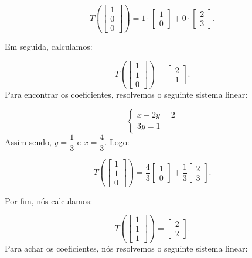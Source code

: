 \begin{Example}
	$$
	T\left(\begin{bmatrix}
		1 \\
		0 \\
		0
	\end{bmatrix}\right) = 1\cdot\begin{bmatrix}
		1 \\
		0
	\end{bmatrix} + 0\cdot\begin{bmatrix}
		2 \\
		3
	\end{bmatrix}.
	$$
	
	Em seguida, calculamos:
	
	$$
	T\left(\begin{bmatrix}
		1 \\
		1 \\
		0
	\end{bmatrix}\right) = \begin{bmatrix}
		2 \\
		1
	\end{bmatrix}.
	$$
	Para encontrar os coeficientes, resolvemos o seguinte sistema linear:
	
	$$
	\begin{cases}
		x + 2y = 2 \\
		3y = 1
	\end{cases}
	$$
	Assim sendo, $y = \dfrac{1}{3}$ e $x = \dfrac{4}{3}$. Logo:
	
	$$
	T\left(\begin{bmatrix}
		1 \\
		1 \\
		0
	\end{bmatrix}\right) = \dfrac{4}{3}\begin{bmatrix}
		1 \\
		0
	\end{bmatrix} + \dfrac{1}{3}\begin{bmatrix}
		2 \\
		3
	\end{bmatrix}.
	$$
	
	Por fim, nós calculamos:
	
	$$
	T\left(\begin{bmatrix}
		1 \\
		1 \\
		1
	\end{bmatrix}\right) = \begin{bmatrix}
		2 \\
		2
	\end{bmatrix}.
	$$
	Para achar os coeficientes, nós resolvemos o seguinte sistema linear:
	

\end{Example}
